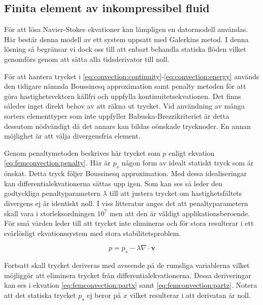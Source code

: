 \subsection{Finita element av inkompressibel fluid}

För att lösa Navier-Stokes ekvationer kan lämpligen en datormodell användas.
Här består denna modell av ett system uppsatt med Galerkins metod.
I denna lösning så begränsar vi dock oss till att enbart behandla statiska flöden
vilket genomförs genom att sätta alla tidsderivator till noll.

För att hantera trycket i \eqref{eq:convection:continuity}-\eqref{eq:convection:energy} används den tidigare nämnda Boussinesq approximation
samt penalty metoden för att göra hastighetsvektorn källfri och uppfylla
kontinuitetsekvationen. Det finns således inget direkt behov av att räkna ut trycket.
Vid användning av många sorters elementtyper som inte uppfyller Babuska-Brezzikriteriet
är detta dessutom nödvändigt då det annars kan bildas oönskade trycknoder. 
En annan möjlighet är att välja divergensfria element. \cite{babuska1973}\cite{segal2011}

Genom penaltymetoden beskrives här trycket som $p$ enligt ekvation
\eqref{eq:femconvection:penalty}. Här är $p_s$ någon form av idealt statiskt
tryck som är önskat. Detta tryck följer Boussinesq approximation. Med dessa
idealiseringar kan differentialekvationerna sättas upp igen. \cite{heinrich88}\cite{taylor79}
Som kan ses så leder den godtyckliga penaltyparametern $\lambda$ till att justera trycket
om hastighetsfältets divergens ej är identiskt noll. I viss litteratur anges 
det att penaltyparametern skall vara i storleksordningen $10^7$ men att den
är väldigt applikationsberoende. För små värden leder till att trycket inte elimineras och
för stora resulterar i ett svårlösligt ekvationssystem med stora stabilitetsproblem.\cite{reddy93}\cite{roy05}\cite{basak04}\cite{segal2011}

\begin{equation}
\label{eq:femconvection:penalty}
p = p_s - \lambda\nabla\cdot\mathbf{v}
\end{equation}

\noindent
Fortsatt skall trycket deriveras med avseende på de rumsliga variablerna vilket möjliggör
att eliminera trycket från differentialekvationerna. Dessa deriveringar kan ses i ekvation
\eqref{eq:femconvection:partx} samt \eqref{eq:femconvection:partz}. Notera att det statiska trycket
$p_s$ ej beror på $x$ vilket resulterar i att derivatan är noll.

